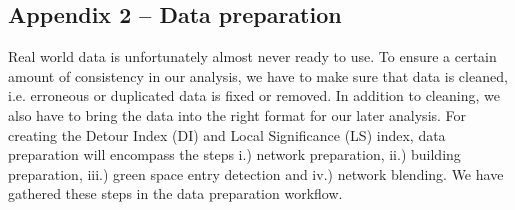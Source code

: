 \documentclass[10pt]{article}
\begin{document}
\subsection{Appendix 2 – Data preparation}
Real world data is unfortunately almost never ready to use.
To ensure a certain amount of consistency in our analysis, we have to make sure that data is cleaned, i.e. erroneous or duplicated data is fixed or removed.
In addition to cleaning, we also have to bring the data into the right format for our later analysis.
For creating the Detour Index (DI) and Local Significance (LS) index, data preparation will encompass the steps i.) network preparation, ii.) building preparation, iii.) green space entry detection and iv.) network blending.
We have gathered these steps in the data preparation workflow.
\end{document}
